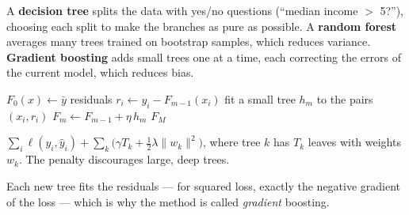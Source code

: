 \documentclass[11pt,a4paper]{article}
\begin{document}
\begin{bdef}
A \textbf{decision tree} splits the data with yes/no questions (``median income $>$ 5?''), choosing each split to make the branches as pure as possible. A \textbf{random forest} averages many trees trained on bootstrap samples, which reduces variance. \textbf{Gradient boosting} adds small trees one at a time, each correcting the errors of the current model, which reduces bias.
\end{bdef}
\begin{balgo}
\begin{algorithmic}[1]
\State $F_0(x)\gets \bar y$ 
  \State residuals $r_i\gets y_i-F_{m-1}(x_i)$
  \State fit a small tree $h_m$ to the pairs $(x_i,r_i)$
  \State $F_m\gets F_{m-1}+\eta\,h_m$ 
\EndFor
\State \Return $F_M$
\end{algorithmic}
\end{balgo}
\begin{bmath}
$\displaystyle\sum_i \ell(y_i,\hat y_i)+\sum_k\Big(\gamma T_k+\tfrac12\lambda\lVert w_k\rVert^2\Big)$, where tree $k$ has $T_k$ leaves with weights $w_k$. The penalty discourages large, deep trees.
\end{bmath}
Each new tree fits the residuals --- for squared loss, exactly the negative gradient of the loss --- which is why the method is called \emph{gradient} boosting.
\end{document}
